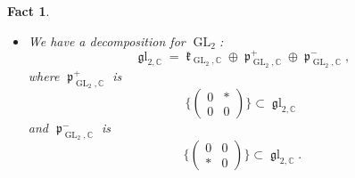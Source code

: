 \documentclass[11pt, a4paper]{amsart}
\theoremstyle{plain}
\newtheorem{fact}[theorem]{Fact}
\theoremstyle{definition}
\numberwithin{equation}{section}
\def\CC{\mathbb{C}}
\DeclareMathOperator{\GL}{\mathrm{GL}}
\DeclareMathOperator{\liek}{\mathfrak k}
\DeclareMathOperator{\lieh}{\mathfrak h}
\DeclareMathOperator{\liep}{\mathfrak p}
\DeclareMathOperator{\liegl}{\mathfrak gl}
\begin{document}
\begin{fact}
\begin{itemize}
\begin{equation*}
              \end{equation*} and $\liep^{-}_{H, \CC}$ is 
              \begin{equation*}
                   \{\begin{pmatrix}
                        0 & 0 \\
                        * & 0 
                     \end{pmatrix}\} \subset \lieh_{\CC}. 
              \end{equation*}
        \item We have a decomposition for $\GL_{2}$: 
              \begin{equation*}
                  \liegl_{2, \CC} = \liek_{\GL_{2}, \CC} \oplus \liep^{+}_{\GL_{2}, \CC} \oplus \liep^{-}_{\GL_{2}, \CC}, 
              \end{equation*}
              where $\liep^{+}_{\GL_{2}, \CC}$ is 
              \begin{equation*}
                   \{\begin{pmatrix}
                        0 & * \\
                        0 & 0 
                     \end{pmatrix}\} \subset \liegl_{2, \CC}
              \end{equation*} and $\liep^{-}_{\GL_{2}, \CC}$ is 
              \begin{equation*}
                   \{\begin{pmatrix}
                        0 & 0 \\
                        * & 0 
                     \end{pmatrix}\} \subset \liegl_{2, \CC}. 
              \end{equation*}
    \end{itemize}
\end{fact}
\end{document}
